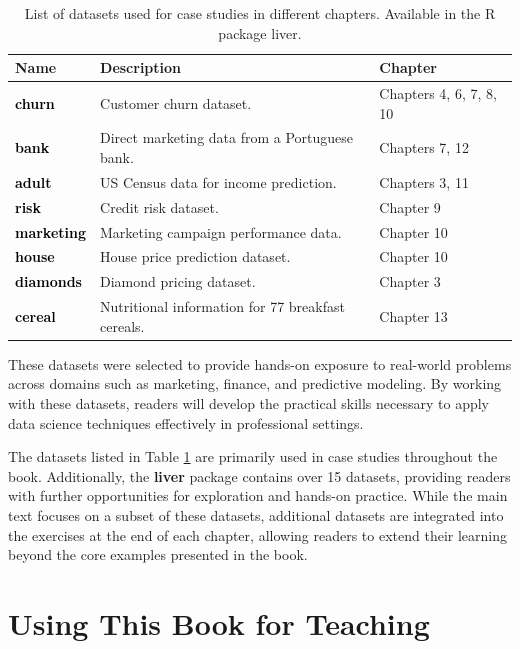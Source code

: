 \documentclass[
  11pt,
]{book}
\theoremstyle{definition}
\theoremstyle{definition}
\theoremstyle{definition}
\theoremstyle{definition}
\theoremstyle{remark}
\begin{document}
\begin{table}
\centering
\caption{\label{tab:data-table}List of datasets used for case studies in different chapters. Available in the R package liver.}
\centering
\begin{tabular}[t]{>{}l>{\raggedright\arraybackslash}p{20em}l}
\toprule
Name & Description & Chapter\\
\midrule
\textcolor{black}{\textbf{churn}} & Customer churn dataset. & Chapters 4, 6, 7, 8, 10\\
\textcolor{black}{\textbf{bank}} & Direct marketing data from a Portuguese bank. & Chapters 7, 12\\
\textcolor{black}{\textbf{adult}} & US Census data for income prediction. & Chapters 3, 11\\
\textcolor{black}{\textbf{risk}} & Credit risk dataset. & Chapter 9\\
\textcolor{black}{\textbf{marketing}} & Marketing campaign performance data. & Chapter 10\\
\addlinespace
\textcolor{black}{\textbf{house}} & House price prediction dataset. & Chapter 10\\
\textcolor{black}{\textbf{diamonds}} & Diamond pricing dataset. & Chapter 3\\
\textcolor{black}{\textbf{cereal}} & Nutritional information for 77 breakfast cereals. & Chapter 13\\
\bottomrule
\end{tabular}
\end{table}

These datasets were selected to provide hands-on exposure to real-world problems across domains such as marketing, finance, and predictive modeling. By working with these datasets, readers will develop the practical skills necessary to apply data science techniques effectively in professional settings.

The datasets listed in Table \ref{tab:data-table} are primarily used in case studies throughout the book. Additionally, the \textbf{liver} package contains over 15 datasets, providing readers with further opportunities for exploration and hands-on practice. While the main text focuses on a subset of these datasets, additional datasets are integrated into the exercises at the end of each chapter, allowing readers to extend their learning beyond the core examples presented in the book.

\section*{Using This Book for Teaching}\label{using-this-book-for-teaching}
\end{document}
